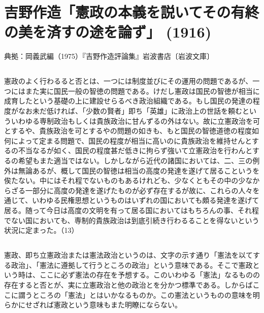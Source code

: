 \section{吉野作造「憲政の本義を説いてその有終の美を済すの途を論ず」 (1916)}



典拠：岡義武編（1975）『吉野作造評論集』岩波書店〔岩波文庫〕


\subsection{}


憲政のよく行わるると否とは、一つには制度並びにその運用の問題であるが、一つにはまた実に国民一般の智徳の問題である。けだし憲政は国民の智徳が相当に成育したという基礎の上に建設せらるべき政治組織である。もし国民の発達の程度がなお未だ低ければ、「少数の賢者」即ち「英雄」に政治上の世話を頼むといういわゆる専制政治もしくは貴族政治に甘んずるの外はない。故に立憲政治を可とするや、貴族政治を可とするやの問題の如きも、もと国民の智徳道徳の程度如何によって定まる問題で、国民の程度が相当に高いのに貴族政治を維持せんとするの不当なるが如く、国民の程度甚だ低きに拘らず強いて立憲政治を行わんとするの希望もまた適当ではない。しかしながら近代の諸国においては、二、三の例外は無論あるが、概して国民の智徳は相当の高度の発達を遂げて居るこというを俟たない。中にはそれ程でないものもあるけれども、少なくともその中の少なからざる一部分に高度の発達を遂げたものが必ず存在するが故に、これらの人々を通じて、いわゆる民権思想というものはいずれの国においても頗る発達を遂げて居る。随って今日は高度の文明を有って居る国においてはもちろんの事、それ程でない国においても、専制的貴族政治は到底引続き行わるることを得ないという状況に定まった。（13）


\subsection{}


憲政、即ち立憲政治または憲法政治というのは、文字の示す通り「憲法を以てする政治」、「憲法に遵拠して行うところの政治」という意味である。そこで憲政という時は、ここに必ず憲法の存在を予想する。このいわゆる「憲法」なるものの存在すると否とが、実に立憲政治と他の政治とを分かつ標準である。しからばここに謂うところの「憲法」とはいかなるものか。この憲法というものの意味を明らかにせざれば憲政という意味もまた明瞭にならない。

